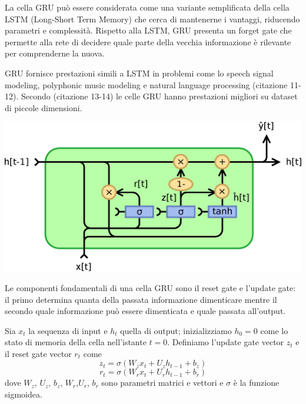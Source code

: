 La cella GRU può essere considerata come una variante semplificata della cella LSTM (Long-Short Term Memory) che cerca di mantenerne i vantaggi, riducendo parametri e complessità. Rispetto alla LSTM, GRU presenta un forget gate che permette alla rete di decidere quale parte della vecchia informazione è rilevante per comprenderne la nuova.

GRU fornisce prestazioni simili a LSTM in problemi come lo speech signal modeling, polyphonic music modeling e natural language processing (citazione 11-12). Secondo (citazione 13-14) le celle GRU hanno prestazioni migliori su dataset di piccole dimensioni.

\vspace{0.25cm} 
\begin{center}
	\includegraphics[scale=0.4]{images/gru2.eps}
	\label{Figura 1.}
\end{center}
\vspace{0.25cm}

Le componenti fondamentali di una cella GRU sono il reset gate e l'update gate: il primo determina quanta della passata informazione dimenticare mentre il secondo quale informazione può essere dimenticata e quale passata all'output. 

Sia $x_{t}$ la sequenza di input e $h_{t}$ quella di output; inizializziamo $h_{0}=0$ come lo stato di memoria della cella nell'istante $t=0$. Definiamo l'update gate vector $z_{t}$ e il reset gate vector $r_{t}$ come
\begin{equation}
	z_{t} = \sigma(W_{z}x_{t}+U_{z}h_{t-1}+b_{z}) 
\end{equation}
\begin{equation}
	r_{t} = \sigma(W_{r}x_{t}+U_{r}h_{t-1}+b_{r})
\end{equation}
dove $W_{z}$, $U_{z}$, $b_{z}$, $W_{r}$,$U_{r}$, $b_{r}$ sono parametri matrici e vettori e $\sigma$ è la funzione sigmoidea. 

